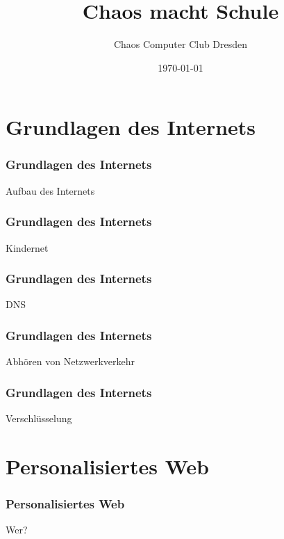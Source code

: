 \documentclass[12pt]{beamer}
\title{Chaos macht Schule}
\author{Chaos Computer Club Dresden}
\date{\today}
\begin{document}
\maketitle

\section{Grundlagen des Internets}

\begin{frame}
  \frametitle{Grundlagen des Internets}
  \begin{center} \Large
  Aufbau des Internets
  \end{center}
\end{frame}

\begin{frame}
  \frametitle{Grundlagen des Internets}
  \begin{center} \Large
  Kindernet
  \end{center}
\end{frame}

\begin{frame}
  \frametitle{Grundlagen des Internets}
  \begin{center} \Large
  DNS
  \end{center}
\end{frame}

\begin{frame}
  \frametitle{Grundlagen des Internets}
  \begin{center} \Large
  Abhören von Netzwerkverkehr
  \end{center}
\end{frame}

\begin{frame}
  \frametitle{Grundlagen des Internets}
  \begin{center} \Large
  Verschlüsselung
  \end{center}
\end{frame}

\section{Personalisiertes Web}

\begin{frame}
  \frametitle{Personalisiertes Web}
  \begin{center} \Large
  Wer?
  \end{center}
\end{frame}
\end{document}
